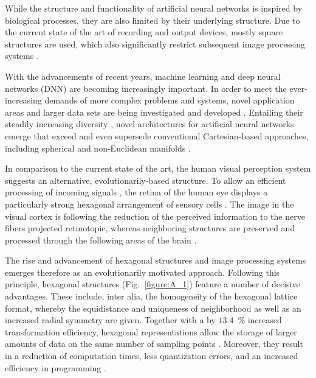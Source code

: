 \documentclass{article}
\begin{document}
\thispagestyle{psp1}

While the structure and functionality of artificial neural networks is inspired by biological processes, they are also limited by their underlying structure. Due to the current state of the art of recording and output devices, mostly square structures are used, which also significantly restrict subsequent image processing systems \cite{Staunton1990}.

With the advancements of recent years, machine learning and deep neural networks (DNN) are becoming increasingly important. In order to meet the ever-increasing demands of more complex problems and systems, novel application areas and larger data sets are being investigated and developed \cite{Krizhevsky2012}. Entailing their steadily increasing diversity \cite{Szegedy2015}, novel architectures for artificial neural networks emerge that exceed and even supersede conventional Cartesian-based approaches, including spherical and non-Euclidean manifolds \cite{Bronstein2017}.

In comparison to the current state of the art, the human visual perception system suggests an alternative, evolutionarily-based structure. To allow an efficient processing of incoming signals \cite{Middleton2005}, the retina of the human eye displays a particularly strong hexagonal arrangement of sensory cells \cite{Curcio1987}. The image in the visual cortex is following the reduction of the perceived information to the nerve fibers projected retinotopic, whereas neighboring structures are preserved and processed through the following areas of the brain \cite{Hubel1968}.

The rise and advancement of hexagonal structures and image processing systems emerges therefore as an evolutionarily motivated approach. Following this principle, hexagonal structures (Fig.~\ref{figure:A_1}) feature a number of decisive advantages. These include, inter alia, the homogeneity of the hexagonal lattice format, whereby the equidistance and uniqueness of neighborhood as well as an increased radial symmetry are given. Together with a by $13.4$~\% increased transformation efficiency, hexagonal representations allow the storage of larger amounts of data on the same number of sampling points \cite{Petersen1962}. Moreover, they result in a reduction of computation times, less quantization errors, and an increased efficiency in programming \cite{Golay1969}.
\end{document}
